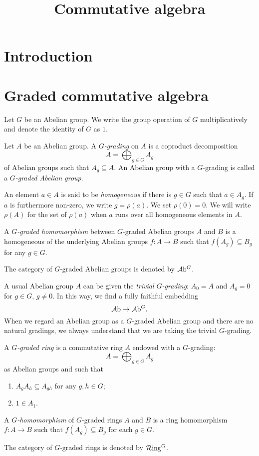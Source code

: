 
\title{Commutative algebra}

\maketitle
\tableofcontents



\section{Introduction}\label{sec-introduction}

\section{Graded commutative algebra}
Let $G$ be an Abelian group. We write the group operation of $G$ multiplicatively and denote the identity of $G$ as $1$.

\begin{definition}
    Let $A$ be an Abelian group. A \emph{$G$-grading} on $A$ is a coproduct decomposition
    \[
        A=\bigoplus_{g\in G}A_g  
    \]
    of Abelian groups such that $A_g\subseteq A$. An Abelian group with a $G$-grading is called a \emph{$G$-graded Abelian group}. 

    An element $a\in A$ is said to be \emph{homogeneous} if there is $g\in G$ such that $a\in A_g$. If $a$ is furthermore non-zero, we write $g=\rho(a)$. We set $\rho(0)=0$. We will write $\rho(A)$ for the set of $\rho(a)$ when $a$ runs over all homogeneous elements in $A$.

    A \emph{$G$-graded homomorphism} between $G$-graded Abelian groups $A$ and $B$ is a homogeneous of the underlying Abelian groups $f:A\rightarrow B$ such that $f(A_g)\subseteq B_g$ for any $g\in G$.

    The category of $G$-graded Abelian groups is denoted by $\mathcal{A}\mathrm{b}^G$.
\end{definition}
A usual Abelian group $A$ can be given the \emph{trivial $G$-grading}: $A_0=A$ and $A_g=0$ for $g\in G$, $g\neq 0$. In this way, we find a fully faithful embedding 
\[
    \mathcal{A}\mathrm{b}\rightarrow \mathcal{A}\mathrm{b}^G.  
\]
When we regard an Abelian group as a $G$-graded Abelian group and there are no natural gradings, we always understand that we are taking the trivial $G$-grading.


\begin{definition}
    A \emph{$G$-graded ring} is a commutative ring $A$ endowed with a $G$-grading:
    \[
        A=\bigoplus_{g\in G} A_g  
    \]
    as Abelian groups and such that 
    \begin{enumerate}
        \item $A_{g}A_{h}\subseteq A_{gh}$ for any $g,h\in G$;
        \item $1\in A_1$.
    \end{enumerate}

    

    A \emph{$G$-homomorphism} of $G$-graded rings $A$ and $B$ is a ring homomorphism $f:A\rightarrow B$ such that $f(A_g)\subseteq B_g$ for each $g\in G$.

    The category of $G$-graded rings is denoted by $\mathcal{R}\mathrm{ing}^G$.
\end{definition}

